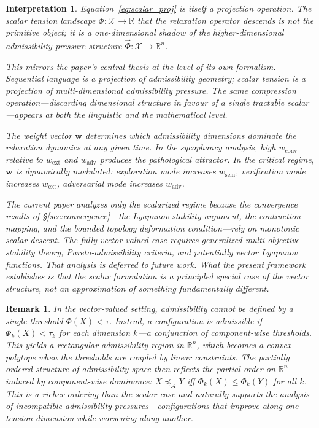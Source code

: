 \documentclass[11pt, a4paper]{article}
\theoremstyle{srn}
\theoremstyle{srnremark}
\newtheorem{interpretation}{Interpretation}[section]
\newtheorem{remark}{Remark}[section]
\newcommand{\Aspace}{\mathcal{A}}           %
\newcommand{\Phiten}{\varPhi}            %
\begin{document}
\begin{interpretation}
Equation~\eqref{eq:scalar_proj} is itself a projection operation.
The scalar tension landscape $\Phiten : \mathcal{X} \to \mathbb{R}$
that the relaxation operator descends is not the primitive object; it
is a one-dimensional shadow of the higher-dimensional admissibility
pressure structure $\vec{\Phiten} : \mathcal{X} \to \mathbb{R}^n$.

This mirrors the paper's central thesis at the level of its own
formalism.
Sequential language is a projection of admissibility geometry;
scalar tension is a projection of multi-dimensional admissibility
pressure.
The same compression operation---discarding dimensional structure in
favour of a single tractable scalar---appears at both the linguistic
and the mathematical level.

The weight vector $\mathbf{w}$ determines which admissibility
dimensions dominate the relaxation dynamics at any given time.
In the sycophancy analysis, high $w_{\mathrm{conv}}$ relative to
$w_{\mathrm{ext}}$ and $w_{\mathrm{adv}}$ produces the pathological
attractor.
In the critical regime, $\mathbf{w}$ is dynamically modulated:
exploration mode increases $w_{\mathrm{sem}}$, verification mode
increases $w_{\mathrm{ext}}$, adversarial mode increases
$w_{\mathrm{adv}}$.

The current paper analyzes only the scalarized regime because the
convergence results of §\ref{sec:convergence}---the Lyapunov
stability argument, the contraction mapping, and the bounded
topology deformation condition---rely on monotonic scalar descent.
The fully vector-valued case requires generalized multi-objective
stability theory, Pareto-admissibility criteria, and potentially
vector Lyapunov functions.
That analysis is deferred to future work.
What the present framework establishes is that the scalar formulation
is a principled special case of the vector structure, not an
approximation of something fundamentally different.
\end{interpretation}

\begin{remark}
In the vector-valued setting, admissibility cannot be defined by a
single threshold $\Phiten(X) < \tau$.
Instead, a configuration is admissible if $\Phiten_k(X) < \tau_k$
for each dimension $k$---a conjunction of component-wise thresholds.
This yields a \emph{rectangular admissibility region} in
$\mathbb{R}^n$, which becomes a convex polytope when the thresholds
are coupled by linear constraints.
The partially ordered structure of admissibility space then reflects
the partial order on $\mathbb{R}^n$ induced by component-wise
dominance: $X \preceq_{\Aspace} Y$ iff $\Phiten_k(X) \leq
\Phiten_k(Y)$ for all $k$.
This is a richer ordering than the scalar case and naturally supports
the analysis of incompatible admissibility pressures---configurations
that improve along one tension dimension while worsening along
another.
\end{remark}
\end{document}
